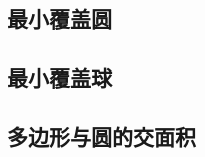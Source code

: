 \documentclass[landscape, oneside, a4paper, cs4size]{book}
\begin{document}
\begin{multicols}{2}
				\subsection{最小覆盖圆}
				\begin{spacing}{0.8}
					
				\end{spacing}
				\subsection{最小覆盖球}
				\begin{spacing}{0.8}
					
				\end{spacing}
				\subsection{多边形与圆的交面积}
				\begin{spacing}{0.8}
					
				\end{spacing}

\end{multicols}
\end{document}
